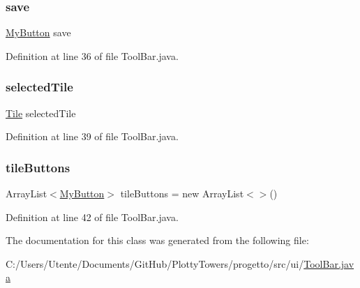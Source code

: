 \mbox{\label{classui_1_1_tool_bar_a66ab06e7800896887c475a3cbd86c447}} 
\subsubsection{\texorpdfstring{save}{save}}
{\footnotesize\ttfamily \hyperlink{classui_1_1_my_button}{My\+Button} save\hspace{0.3cm}{\ttfamily [private]}}



Definition at line 36 of file Tool\+Bar.\+java.

\mbox{\label{classui_1_1_tool_bar_a57de6d93afd033cf117e53aec7cf844a}} 
\subsubsection{\texorpdfstring{selected\+Tile}{selectedTile}}
{\footnotesize\ttfamily \hyperlink{classobjects_1_1_tile}{Tile} selected\+Tile\hspace{0.3cm}{\ttfamily [private]}}



Definition at line 39 of file Tool\+Bar.\+java.

\mbox{\label{classui_1_1_tool_bar_a08aae8564da16789b69554ee7ddb559d}} 
\subsubsection{\texorpdfstring{tile\+Buttons}{tileButtons}}
{\footnotesize\ttfamily Array\+List$<$\hyperlink{classui_1_1_my_button}{My\+Button}$>$ tile\+Buttons = new Array\+List$<$$>$()\hspace{0.3cm}{\ttfamily [private]}}



Definition at line 42 of file Tool\+Bar.\+java.



The documentation for this class was generated from the following file\+:\begin{DoxyCompactItemize}
\item 
C\+:/\+Users/\+Utente/\+Documents/\+Git\+Hub/\+Plotty\+Towers/progetto/src/ui/\hyperlink{_tool_bar_8java}{Tool\+Bar.\+java}\end{DoxyCompactItemize}
